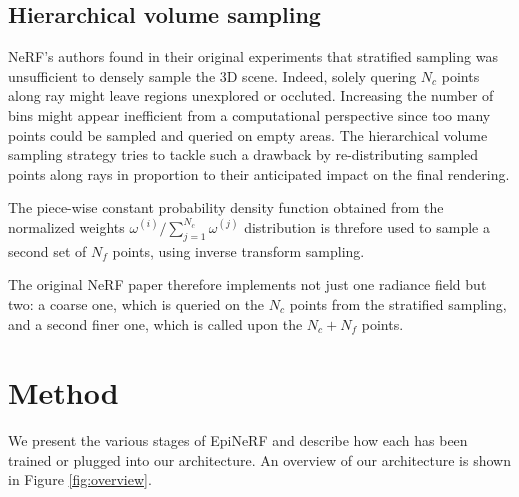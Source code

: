 \subsection{Hierarchical volume sampling}

\ac{NeRF}'s authors found in their original experiments that stratified sampling was unsufficient to densely sample the 3D scene. Indeed, solely quering $N_{c}$ points along ray might leave regions unexplored or occluted. Increasing the number of bins might appear inefficient from a computational perspective since too many points could be sampled and queried on empty areas. The hierarchical volume sampling strategy tries to tackle such a drawback by re-distributing sampled points along rays in proportion to their anticipated impact on the final rendering. 

The piece-wise constant probability density function obtained from the normalized weights $\omega^{(i)}/ \sum_{j=1}^{N_c}\omega^{(j)}$ distribution is threfore used to sample a second set of $N_f$ points, using inverse transform sampling.

The original \ac{NeRF} paper therefore implements not just one radiance field but two: a coarse one, which is queried on the $N_c$ points from the stratified sampling, and a second finer one, which is called upon the $N_{c}+N_{f}$ points. 

\section{Method}
We present the various stages of EpiNeRF and describe how each has been trained or plugged into our architecture. An overview of our architecture is shown in Figure \ref{fig:overview}.

